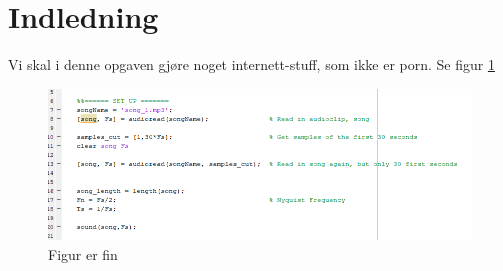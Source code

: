 \section{Indledning}


Vi skal i denne opgaven gjøre noget internett-stuff, som ikke er porn. Se figur \ref{fig:opg0_setup}

\begin{figure}[H]
\centering
\includegraphics[scale=0.55]{Img/opg0/img_0_setup.png}
\caption{Figur er fin}
\label{fig:opg0_setup}
\end{figure}